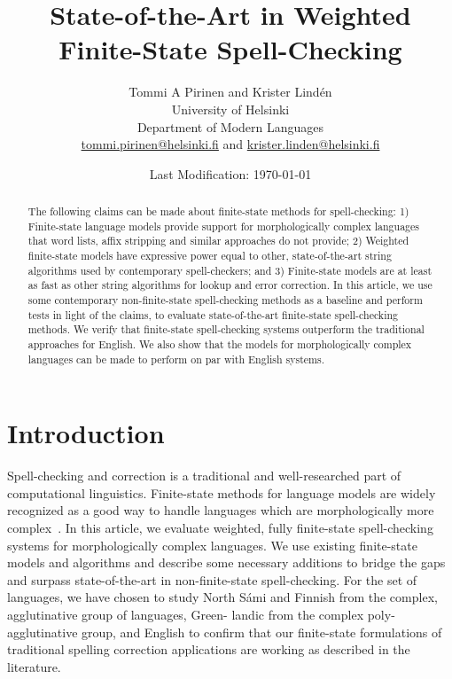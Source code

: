 \documentclass[postprint]{flammie}
\title{State-of-the-Art in Weighted Finite-State Spell-Checking}
\author{Tommi A Pirinen and Krister Lindén\\
University of Helsinki\\
Department of Modern Languages\\
\url{tommi.pirinen@helsinki.fi} and \url{krister.linden@helsinki.fi}}
\date{Last Modification: \today}
\begin{document}
\maketitle

\begin{abstract}
The following claims can be made about finite-state methods for spell-checking:
1) Finite-state language models provide support for morphologically complex
languages that word lists, affix stripping and similar approaches do not
provide; 2) Weighted finite-state models have expressive power equal to other,
state-of-the-art string algorithms used by contemporary spell-checkers; and 3)
Finite-state models are at least as fast as other string algorithms for lookup
and error correction. In this article, we use some contemporary
non-finite-state spell-checking methods as a baseline and perform tests in
light of the claims, to evaluate state-of-the-art finite-state spell-checking
methods. We verify that finite-state spell-checking systems outperform the
traditional approaches for English. We also show that the models for
morphologically complex languages can be made to perform on par with English
systems.

\end{abstract}

\section{Introduction}

Spell-checking and correction is a traditional and well-researched part of
computational linguistics. Finite-state methods for language models are
widely recognized as a good way to handle languages which are morphologically
more complex~\cite{beesley2003finite}. In this article, we evaluate weighted, fully finite-state
spell-checking systems for morphologically complex languages. We use existing
finite-state models and algorithms and describe some necessary additions to
bridge the gaps and surpass state-of-the-art in non-finite-state
spell-checking. For the set of languages, we have chosen to study North Sámi
and Finnish from the complex, agglutinative group of languages, Green- landic
from the complex poly-agglutinative group, and English to confirm that our
finite-state formulations of traditional spelling correction applications are
working as described in the literature.
\end{document}
